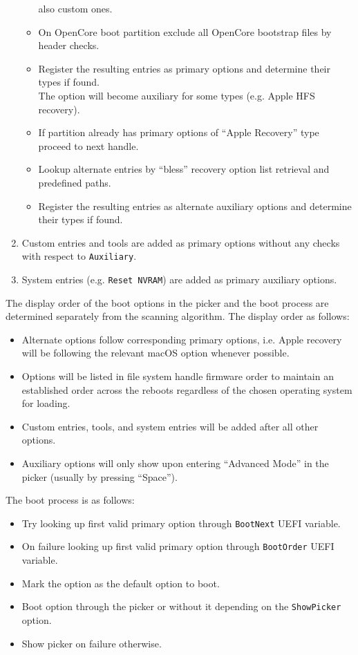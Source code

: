 \documentclass[]{article}
\providecommand{\tightlist}{%
  \setlength{\itemsep}{0pt}\setlength{\parskip}{0pt}}
\begin{document}
\begin{enumerate}
\begin{itemize}
    also custom ones.
  \item On OpenCore boot partition exclude all OpenCore bootstrap files by header checks.
  \item Register the resulting entries as primary options and determine their types if found. \\
  The option will become auxiliary for some types (e.g. Apple HFS recovery).
  \item If partition already has primary options of ``Apple Recovery'' type proceed to next handle.
  \item Lookup alternate entries by ``bless'' recovery option list retrieval and predefined paths.
  \item Register the resulting entries as alternate auxiliary options and determine their types if found.
  \end{itemize}
\item Custom entries and tools are added as primary options without any checks with respect to \texttt{Auxiliary}.
\item System entries (e.g. \texttt{Reset NVRAM}) are added as primary auxiliary options.
\end{enumerate}

The display order of the boot options in the picker and the boot process are determined separately from the scanning
algorithm. The display order as follows:

\begin{itemize}
\tightlist
\item Alternate options follow corresponding primary options, i.e. Apple recovery will be following the
  relevant macOS option whenever possible.
\item Options will be listed in file system handle firmware order to maintain an established order across
  the reboots regardless of the chosen operating system for loading.
\item Custom entries, tools, and system entries will be added after all other options.
\item Auxiliary options will only show upon entering ``Advanced Mode'' in the picker (usually by pressing ``Space'').
\end{itemize}

The boot process is as follows:
\begin{itemize}
\tightlist
\item Try looking up first valid primary option through \texttt{BootNext} UEFI variable.
\item On failure looking up first valid primary option through \texttt{BootOrder} UEFI variable.
\item Mark the option as the default option to boot.
\item Boot option through the picker or without it depending on the \texttt{ShowPicker} option.
\item Show picker on failure otherwise.
\end{itemize}
\end{document}

